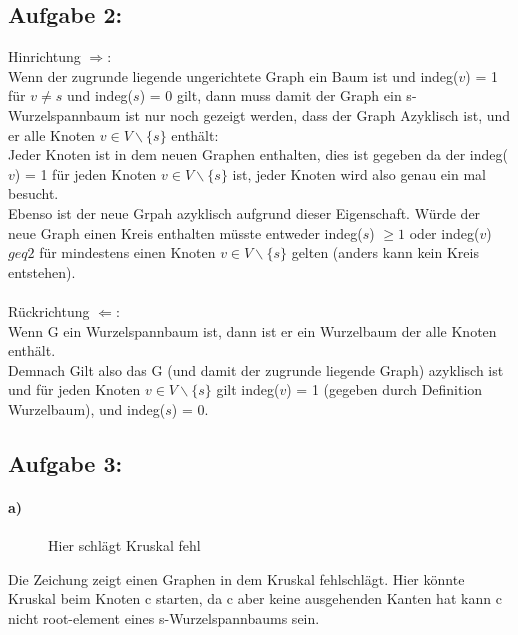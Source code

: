 \documentclass[a4paper]{article}
\begin{document}
\subsection*{Aufgabe 2:}
Hinrichtung $\Rightarrow$: \\
Wenn der zugrunde liegende ungerichtete Graph ein Baum ist und indeg($v$) = 1 
für $v \neq s$ und indeg($s$) = 0 gilt, dann muss damit der Graph ein s-Wurzelspannbaum
ist nur noch gezeigt werden, dass der Graph Azyklisch ist, und er alle Knoten $v \in V  \backslash \{s\}$
enthält: \\
Jeder Knoten ist in dem neuen Graphen enthalten, dies ist gegeben da der indeg($v$) = 1
für jeden Knoten $v \in V  \backslash \{s\}$ ist, jeder Knoten wird also genau ein mal besucht. \\
Ebenso ist der neue Grpah azyklisch aufgrund dieser Eigenschaft. Würde der neue
Graph einen Kreis enthalten müsste entweder indeg($s$) $\geq 1$ oder indeg($v$) $geq 2$
für mindestens einen Knoten $v \in V \backslash \{s\}$ gelten (anders kann kein Kreis entstehen). \\
\\
Rückrichtung $\Leftarrow$: \\
Wenn G ein Wurzelspannbaum ist, dann ist er ein Wurzelbaum der alle Knoten enthält. \\
Demnach Gilt also das G (und damit der zugrunde liegende Graph) azyklisch ist und
für jeden Knoten $v \in V \backslash \{s\}$ gilt indeg($v$) = 1 (gegeben durch Definition
Wurzelbaum), und indeg($s$) = 0.
\subsection*{Aufgabe 3:}
\paragraph*{a)}
\begin{figure}[H]
    \centering
\caption{Hier schlägt Kruskal fehl}
\end{figure}
Die Zeichung zeigt einen Graphen in dem Kruskal fehlschlägt. Hier könnte Kruskal beim Knoten c starten,
da c aber keine ausgehenden Kanten hat kann c nicht root-element eines s-Wurzelspannbaums sein.
\end{document}
